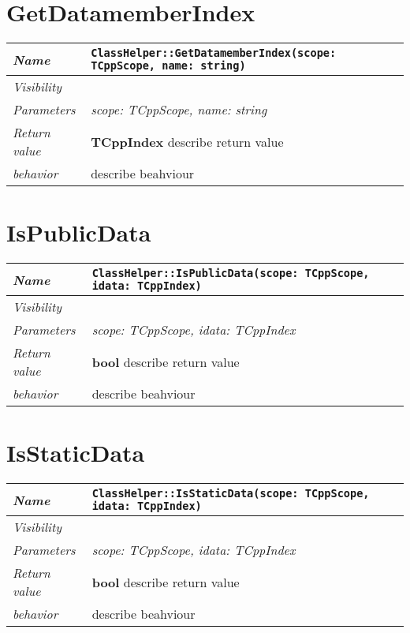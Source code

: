  \section{GetDatamemberIndex}
\begin{longtable}{p{3cm} @{\hskip 1cm} p{12cm}}
 \hline
\textit{Name} & \texttt{ClassHelper::GetDatamemberIndex(scope: TCppScope, name: string)}\\
\hline
 \textit{Visibility} & \\
\hline
\textit{Parameters} & \textit{scope: TCppScope, name: string}\\
\hline
\textit{Return value} & \textbf{ TCppIndex} describe return value\\
  \hline
 \textit{behavior} & describe beahviour \\
\hline
\end{longtable} \pagebreak
 \section{IsPublicData}
\begin{longtable}{p{3cm} @{\hskip 1cm} p{12cm}}
 \hline
\textit{Name} & \texttt{ClassHelper::IsPublicData(scope: TCppScope, idata: TCppIndex)}\\
\hline
 \textit{Visibility} & \\
\hline
\textit{Parameters} & \textit{scope: TCppScope, idata: TCppIndex}\\
\hline
\textit{Return value} & \textbf{ bool} describe return value\\
  \hline
 \textit{behavior} & describe beahviour \\
\hline
\end{longtable} \pagebreak
 \section{IsStaticData}
\begin{longtable}{p{3cm} @{\hskip 1cm} p{12cm}}
 \hline
\textit{Name} & \texttt{ClassHelper::IsStaticData(scope: TCppScope, idata: TCppIndex)}\\
\hline
 \textit{Visibility} & \\
\hline
\textit{Parameters} & \textit{scope: TCppScope, idata: TCppIndex}\\
\hline
\textit{Return value} & \textbf{ bool} describe return value\\
  \hline
 \textit{behavior} & describe beahviour \\
\hline
\end{longtable} \pagebreak
